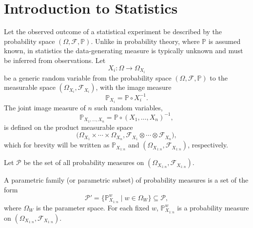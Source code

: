 \chapter{Introduction to Statistics}
\label{chp:statistics_introduction}
Let the observed outcome of a statistical experiment be described by the probability space $(\Omega, \mathcal{F}, \mathbb{P})$. Unlike in probability theory, where $\mathbb{P}$ is assumed known, in statistics the data-generating measure is typically unknown and must be inferred from observations. Let~\cite{orbanz2009functional,tausk2023basic,drewitz2019introduction,chan2021introduction}
\begin{equation}
	X_i: \Omega \to \Omega_{X_i}
\end{equation}
be a generic random variable from the probability space $(\Omega,\mathcal{F},\mathbb{P})$ to the measurable space $(\Omega_{X_i},\mathcal{F}_{X_i})$, with the image measure
\begin{equation}
	\mathbb{P}_{X_i} = \mathbb{P} \circ X_i^{-1}.
\end{equation}
The joint image measure of $n$ such random variables,
\begin{equation}
	\mathbb{P}_{X_1,\dots,X_n} = \mathbb{P} \circ (X_1,\dots,X_n)^{-1},
\end{equation}
is defined on the product measurable space
\begin{equation}
	\bigl(\Omega_{X_1}\times \cdots \times \Omega_{X_n}, \mathcal{F}_{X_1}\otimes \cdots \otimes \mathcal{F}_{X_n}\bigr),
\end{equation}
which for brevity will be written as $\mathbb{P}_{X_{1:n}}$ and $(\Omega_{X_{1:n}},\mathcal{F}_{X_{1:n}})$, respectively.

\begin{definition}
	Let $\mathcal{P}$ be the set of all probability measures on $(\Omega_{X_{1:n}},\mathcal{F}_{X_{1:n}})$.
\end{definition}

\begin{definition}
	\label{def:parametric_family}
	A parametric family (or parametric subset) of probability measures is a set of the form
	\begin{equation}
		\mathcal{P}' = \{ \mathbb{P}^w_{X_{1:n}} \mid w \in \Omega_W \} \subseteq \mathcal{P},
	\end{equation}
	where $\Omega_W$ is the parameter space. For each fixed $w$, $\mathbb{P}^w_{X_{1:n}}$ is a probability measure on $(\Omega_{X_{1:n}},\mathcal{F}_{X_{1:n}})$.
\end{definition}

